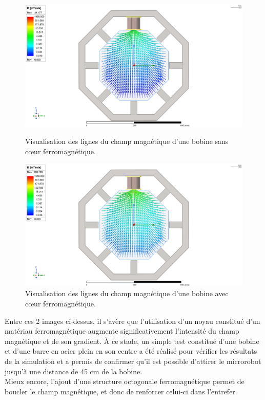 \documentclass{article}
\begin{document}
\begin{figure}[H]
    \centering
    \begin{minipage}{0.45\textwidth}
        \centering
        \includegraphics[width=\linewidth]{Images/SupportPlastique.png}
        \caption{Visualisation des lignes du champ magnétique d'une bobine sans cœur ferromagnétique.}
    \end{minipage}\hfill
    \begin{minipage}{0.45\textwidth}
        \centering
        \includegraphics[width=\linewidth]{Images/SupportPlastique+FerDansBobine.png}
        \caption{Visualisation des lignes du champ magnétique d'une bobine avec cœur ferromagnétique.}
    \end{minipage}\hfill
\end{figure}
\noindent
Entre ces 2 images ci-dessus, il s'avère que l'utilisation d'un noyau constitué d'un matériau ferromagnétique augmente significativement l'intensité du champ magnétique et de son gradient. À ce stade, un simple test constitué d'une bobine et d'une barre en acier plein en son centre a été réalisé pour vérifier les résultats de la simulation et a permis de confirmer qu'il est possible d'attirer le microrobot jusqu'à une distance de 45 cm de la bobine. \\Mieux encore, l'ajout d'une structure octogonale ferromagnétique permet de boucler le champ magnétique, et donc de renforcer celui-ci dans l'entrefer.
\end{document}

